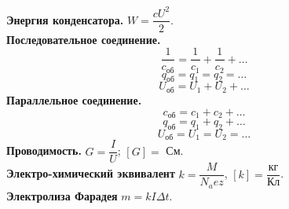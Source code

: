 \documentclass[12pt]{article}
\begin{document}
	\textbf{Энергия конденсатора.} $W = \dfrac{c U^2}{2}$.\\
	\textbf{Последовательное соединение.}
	$$
	\dfrac{1}{c_{\text{об}}} = \dfrac{1}{c_1} + \dfrac{1}{c_2} + \dots
	$$
	$$
	q_{\text{об}} = q_1 = q_2 = \dots
	$$
	$$
	U_{\text{об}} = U_1 + U_2 + \dots
	$$
	\textbf{Параллельное соединение.}
	$$
	c_{\text{об}} = c_1 + c_2 + \dots
	$$
	$$
	q_{\text{об}} = q_1 + q_2 + \dots
	$$
	$$
	U_{\text{об}} = U_1 = U_2 = \dots
	$$
	\textbf{Проводимость.} $G = \dfrac{I}{U}$; $[G] =$ См.\\
	\textbf{Электро-химический эквивалент} $k = \dfrac{M}{N_a e z}$, $[k] = \dfrac{\text{кг}}{\text{Кл}}$.\\
	\textbf{Электролиза Фарадея} $m = k I \varDelta t$.
\end{document}
